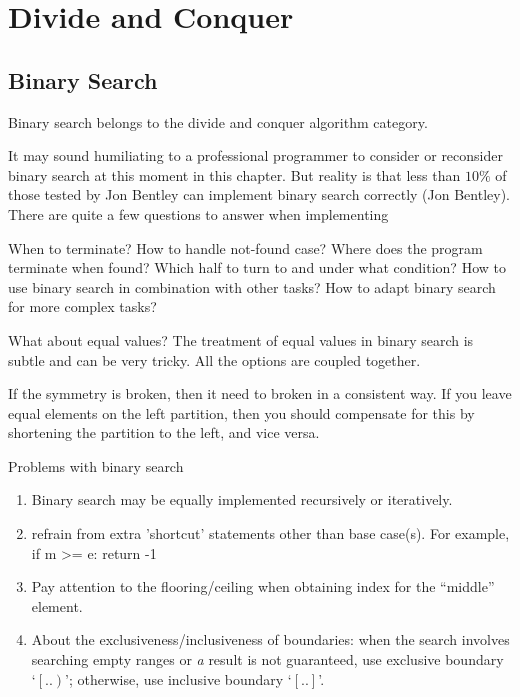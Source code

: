
\chapter{Divide and Conquer}\label{ch:divideAndConquer}

\section{Binary Search}\label{sec:binary-search}

Binary search belongs to the divide and conquer algorithm category.

\label{Evernote:Print two binary search trees in ascending order}

It may sound humiliating to a professional programmer to consider or reconsider binary search at
this moment in this chapter.
But reality is that less than $10\%$ of those tested by Jon Bentley can implement binary search
correctly (Jon Bentley).
There are quite a few questions to answer when implementing

When to terminate?
How to handle not-found case?
Where does the program terminate when found?
Which half to turn to and under what condition?
How to use binary search in combination with other tasks?
How to adapt binary search for more complex tasks?

What about equal values?
The treatment of equal values in binary search is subtle and can be very tricky.
All the options are coupled together.

If the symmetry is broken, then it need to broken in a consistent way.
If you leave equal elements on the left partition, then you should compensate for this by
shortening the partition to the left, and vice versa.

Problems with binary search
\begin{enumerate}
    \item Binary search may be equally implemented recursively or iteratively.
    \item refrain from extra 'shortcut' statements other than base case(s).
    For example,
    if m >= e:
    return -1
    \item Pay attention to the flooring/ceiling when obtaining index for the ``middle'' element.
    \item About the exclusiveness/inclusiveness of boundaries: when the search involves searching
    empty ranges or \emph{a} result is not guaranteed, use exclusive boundary `$\left[..\right)$';
    otherwise, use inclusive boundary `$\left[..\right]$'.
\end{enumerate}

